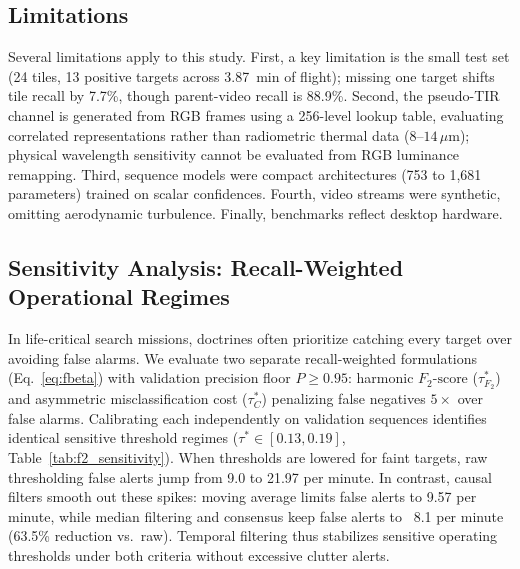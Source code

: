 \documentclass[conference]{IEEEtran}
\begin{document}
\subsection{Limitations}
Several limitations apply to this study. First, a key limitation is the small test set (24 tiles, 13 positive targets across 3.87~min of flight); missing one target shifts tile recall by 7.7\%, though parent-video recall is 88.9\%. Second, the pseudo-TIR channel is generated from RGB frames using a 256-level lookup table, evaluating correlated representations rather than radiometric thermal data ($8\text{--}14\,\mu\text{m}$); physical wavelength sensitivity cannot be evaluated from RGB luminance remapping. Third, sequence models were compact architectures (753 to 1,681 parameters) trained on scalar confidences. Fourth, video streams were synthetic, omitting aerodynamic turbulence. Finally, benchmarks reflect desktop hardware.

\subsection{Sensitivity Analysis: Recall-Weighted Operational Regimes}
\label{sec:sensitivity_analysis}
In life-critical search missions, doctrines often prioritize catching every target over avoiding false alarms. We evaluate two separate recall-weighted formulations (Eq.~\eqref{eq:fbeta}) with validation precision floor $P \ge 0.95$: harmonic $F_2\text{-score}$ ($\tau^*_{F_2}$) and asymmetric misclassification cost ($\tau^*_{C}$) penalizing false negatives $5\times$ over false alarms. Calibrating each independently on validation sequences identifies identical sensitive threshold regimes ($\tau^* \in [0.13, 0.19]$, Table~\ref{tab:f2_sensitivity}). When thresholds are lowered for faint targets, raw thresholding false alerts jump from 9.0 to 21.97 per minute. In contrast, causal filters smooth out these spikes: moving average limits false alerts to 9.57 per minute, while median filtering and consensus keep false alerts to ~8.1 per minute (63.5\% reduction vs.\ raw). Temporal filtering thus stabilizes sensitive operating thresholds under both criteria without excessive clutter alerts.

\begin{table}[!t]
\centering
\caption{Recall-Weighted ($F_2$, Asymmetric Cost) vs.\ Baseline Operating Points}
\label{tab:f2_sensitivity}
\end{table}
\end{document}
